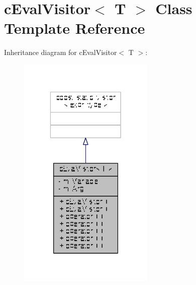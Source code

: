 \hypertarget{classcEvalVisitor}{\section{c\-Eval\-Visitor$<$ T $>$ Class Template Reference}
\label{classcEvalVisitor}
}


Inheritance diagram for c\-Eval\-Visitor$<$ T $>$\-:
\nopagebreak
\begin{figure}[H]
\begin{center}
\leavevmode
\includegraphics[width=184pt]{classcEvalVisitor__inherit__graph}
\end{center}
\end{figure}


